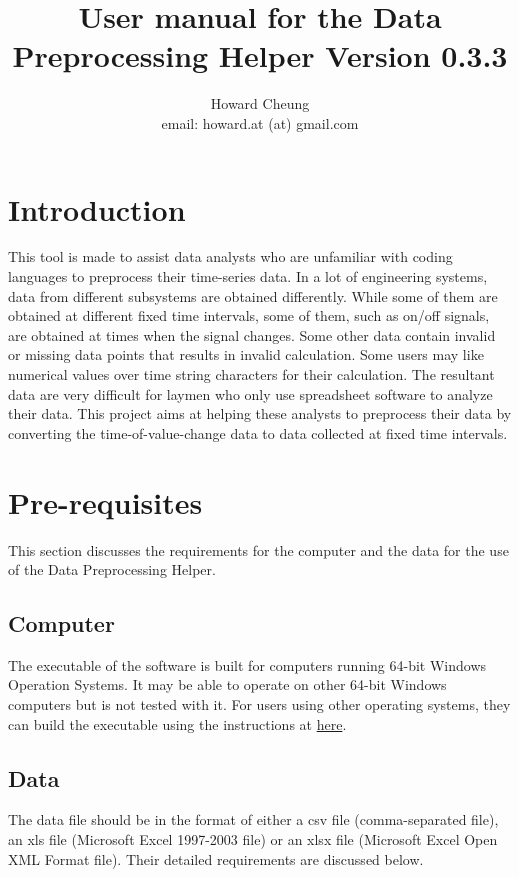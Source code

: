 \documentclass[12pt,a4paper]{article}
\author{Howard Cheung \\ email: howard.at (at) gmail.com }
\title{User manual for the Data Preprocessing Helper Version 0.3.3}
\begin{document}
\maketitle

\tableofcontents

\section{Introduction}

This tool is made to assist data analysts who are unfamiliar with coding languages to preprocess their time-series data.
In a lot of engineering systems, data from different subsystems are obtained differently.
While some of them are obtained at different fixed time intervals, some of them, such as on/off signals, are obtained at times when the signal changes.
Some other data contain invalid or missing data points that results in invalid calculation.
Some users may like numerical values over time string characters for their calculation.
The resultant data are very difficult for laymen who only use spreadsheet software to analyze their data.
This project aims at helping these analysts to preprocess their data by converting the time-of-value-change data to data collected at fixed time intervals.

\section{Pre-requisites}
This section discusses the requirements for the computer and the data for the use of the Data Preprocessing Helper.

\subsection{Computer}
The executable of the software is built for computers running 64-bit Windows Operation Systems.
It may be able to operate on other 64-bit Windows computers but is not tested with it.
For users using other operating systems, they can build the executable using the instructions at \href{https://github.com/howardcheung/data-preprocessing-helper/blob/master/exe/README.md}{here}.

\subsection{Data}
The data file should be in the format of either a csv file (comma-separated file), an xls file (Microsoft Excel 1997-2003 file) or an xlsx file (Microsoft Excel Open XML Format file). Their detailed requirements are discussed below.
\end{document}
